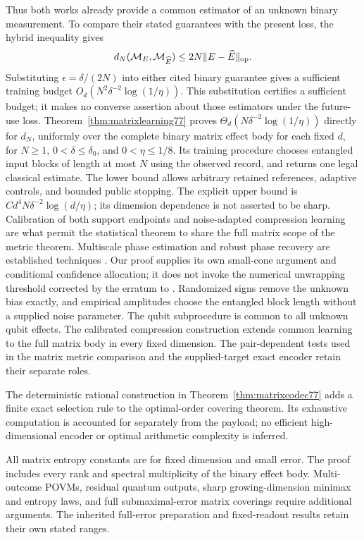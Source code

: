 Thus both works already provide a common estimator of an
unknown binary measurement. To compare their stated guarantees
with the present loss, the hybrid inequality gives
\[
 d_N(\mathcal M_E,\mathcal M_{\widehat E})
      \le 2N\|E-\widehat E\|_{\rm op}.
\]
Substituting $\epsilon=\delta/(2N)$ into either cited
binary guarantee gives a sufficient training budget
$O_d(N^2\delta^{-2}\log(1/\eta))$.
This substitution certifies a sufficient budget; it makes no converse
assertion about those estimators under the future-use loss.
Theorem~\ref{thm:matrixlearning77} proves
$\Theta_d(N\delta^{-2}\log(1/\eta))$ directly for $d_N$,
uniformly over the complete binary matrix effect body for each fixed
$d$, for
$N\ge1$, $0<\delta\le\delta_0$, and $0<\eta\le1/8$.
Its training procedure chooses entangled input blocks of length
at most $N$ using the observed record, and returns one legal
classical estimate. The lower bound allows arbitrary retained
references, adaptive controls, and bounded public stopping.
The explicit upper bound is $Cd^4N\delta^{-2}\log(d/\eta)$;
its dimension dependence is not asserted to be sharp. Calibration of
both support endpoints and noise-adapted compression learning are
what permit the statistical theorem to share the full matrix scope
of the metric theorem.
Multiscale phase estimation and robust phase recovery are
established techniques \cite{HB76,KLY76}. Our proof supplies its
own small-cone argument and conditional confidence allocation;
it does not invoke the numerical unwrapping threshold corrected
by the erratum to \cite{KLY76}. Randomized signs remove the
unknown bias exactly, and empirical amplitudes choose the
entangled block length without a supplied noise parameter.
The qubit subprocedure is common to all unknown qubit effects.
The calibrated compression construction extends common learning to
the full matrix body in every fixed dimension. The pair-dependent tests used in the matrix
metric comparison and the supplied-target exact encoder retain
their separate roles.

The deterministic rational construction in
Theorem~\ref{thm:matrixcodec77} adds a finite exact selection rule
to the optimal-order covering theorem. Its exhaustive computation is
accounted for separately from the payload; no efficient high-dimensional
encoder or optimal arithmetic complexity is inferred.

All matrix entropy constants are for fixed dimension and small
error. The proof includes every rank and spectral multiplicity
of the binary effect body. Multi-outcome POVMs, residual quantum
outputs, sharp growing-dimension minimax and entropy laws, and full submaximal-error
matrix coverings require additional arguments. The inherited
full-error preparation and fixed-readout results retain their
own stated ranges.
